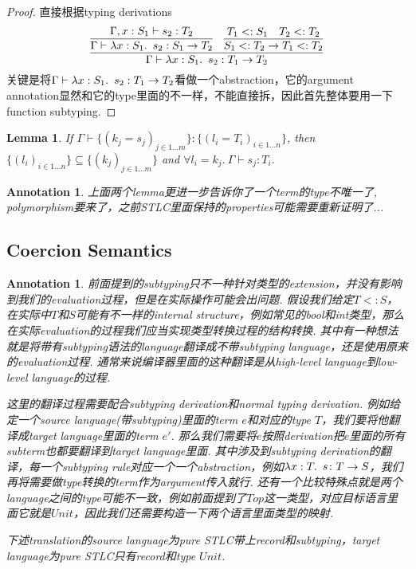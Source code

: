 \documentclass{article}
\theoremstyle{plain}
\newtheorem{lemma}[theorem]{Lemma}
\newtheorem{annotation}[theorem]{Annotation}
\theoremstyle{nonumberplain}
\newtheorem{proof}{Proof}
\newcommand{\lam}[2]{\ensuremath{\lambda #1\ldotp~ #2}} %
\newcommand{\termtype}[2]{\ensuremath{#1:#2}}
\newcommand{\subtyp}[2]{#1<:#2}
\begin{document}
\begin{proof}
直接根据typing derivations
$$
\infer{\Gamma \vdash \termtype{\lam{\termtype{x}{S_1}}{s_2}}{T_1 \to T_2}}{\infer{\Gamma \vdash \termtype{\lam{\termtype{x}{S_1}}{s_2}}{S_1 \to T_2}}{\Gamma,\termtype{x}{S_1} \vdash \termtype{s_2}{T_2}} & \infer{\subtyp{S_1}{T_2} \to \subtyp{T_1}{T_2}}{\subtyp{T_1}{S_1} & \subtyp{T_2}{T_2}}}
$$
关键是将$\Gamma \vdash \termtype{\lam{\termtype{x}{S_1}}{s_2}}{T_1 \to T_2}$看做一个abstraction，它的argument annotation显然和它的type里面的不一样，不能直接拆，因此首先整体要用一下function subtyping.
\end{proof}

\begin{lemma}
\rm If $\Gamma \vdash \termtype{\{{(k_j = s_j)}_{j \in 1\ldots m}\}}{\{{(l_i = T_i)}_{i \in 1\ldots n}\}}$, then $\{{(l_i)}_{i \in 1\ldots n}\}\subseteq\{{(k_j)}_{j \in 1\ldots m}\}$ and $\forall l_i = k_j.~ \Gamma \vdash \termtype{s_j}{T_i}$.
\end{lemma}

\begin{annotation}
\rm 上面两个lemma更进一步告诉你了一个term的type不唯一了, polymorphism要来了，之前STLC里面保持的properties可能需要重新证明了...
\end{annotation}

\newpage
\subsection{Coercion Semantics}


\begin{annotation}
\rm 前面提到的subtyping只不一种针对类型的extension，并没有影响到我们的evaluation过程，但是在实际操作可能会出问题. 假设我们给定$\subtyp{T}{S}$，在实际中$T$和$S$可能有不一样的internal structure，例如常见的bool和int类型，那么在实际evaluation的过程我们应当实现类型转换过程的结构转换. 其中有一种想法就是将带有subtyping语法的language翻译成不带subtyping language，还是使用原来的evaluation过程. 通常来说编译器里面的这种翻译是从high-level language到low-level language的过程. 

这里的翻译过程需要配合subtyping derivation和normal typing derivation. 例如给定一个source language(带subtyping)里面的term $e$和对应的type $T$，我们要将他翻译成target language里面的term $e'$. 那么我们需要将$e$按照derivation把$e$里面的所有subterm也都要翻译到target language里面. 其中涉及到subtyping derivation的翻译，每一个subtyping rule对应一个一个abstraction，例如$\lam{\termtype{x}{T}}{s}\colon T \to S$，我们再将需要做type转换的term作为argument传入就行. 还有一个比较特殊点就是两个language之间的type可能不一致，例如前面提到了$Top$这一类型，对应目标语言里面它就是$Unit$，因此我们还需要构造一下两个语言里面类型的映射. 

下述translation的source language为pure STLC带上record和subtyping，target language为pure STLC只有record和type $Unit$. 
\end{annotation}
\end{document}
